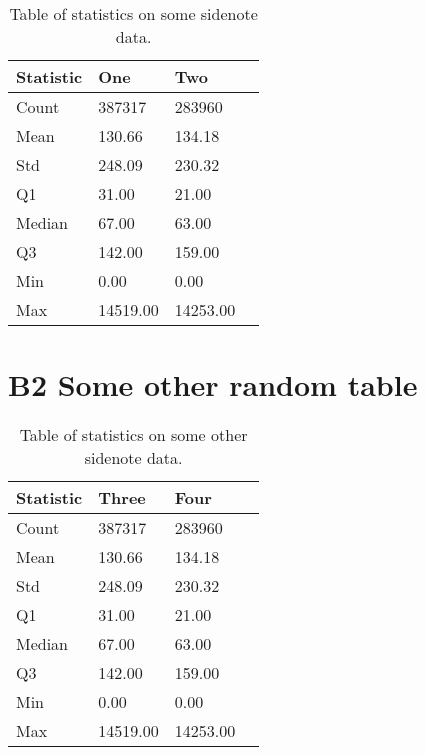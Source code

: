 \begin{table}[ht!]
\centering
    \begin{tabular}{ m{4cm} m{2.5cm} m{2.5cm} m{2.5cm} } 
    \toprule
    \toprule
    \textbf{Statistic} & \textbf{One} & \textbf{Two}  \\
    \midrule
    Count   & 387317    & 283960    \\[1.3ex]
    Mean    & 130.66    & 134.18    \\[1.3ex]
    Std     & 248.09    & 230.32    \\[1.3ex]
    Q1      & 31.00     & 21.00     \\[1.3ex]
    Median  & 67.00     & 63.00     \\[1.3ex]
    Q3      & 142.00    & 159.00    \\[1.3ex]
    Min     & 0.00      & 0.00      \\[1.3ex]
    Max     & 14519.00  & 14253.00  \\[1.3ex]
    \bottomrule
    \bottomrule
    \end{tabular}
\caption[Statistics on something]{Table of statistics on some sidenote data.}
\end{table}


\newpage
\section*{\large{B2 \quad Some other random table}}
\vspace*{1cm}

\begin{table}[ht!]
\centering
    \begin{tabular}{ m{4cm} m{2.5cm} m{2.5cm} m{2.5cm} } 
    \toprule
    \toprule
    \textbf{Statistic} & \textbf{Three} & \textbf{Four}  \\
    \midrule
    Count   & 387317    & 283960    \\[1.3ex]
    Mean    & 130.66    & 134.18    \\[1.3ex]
    Std     & 248.09    & 230.32    \\[1.3ex]
    Q1      & 31.00     & 21.00     \\[1.3ex]
    Median  & 67.00     & 63.00     \\[1.3ex]
    Q3      & 142.00    & 159.00    \\[1.3ex]
    Min     & 0.00      & 0.00      \\[1.3ex]
    Max     & 14519.00  & 14253.00  \\[1.3ex]
    \bottomrule
    \bottomrule
    \end{tabular}
\caption[Statistics on something else]{Table of statistics on some other sidenote data.}
\end{table}



